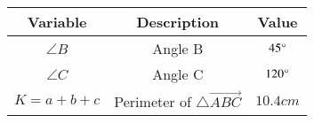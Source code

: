 \begin{tabular}[12pt]{ |c|c|c|}
    \hline
	\textbf{Variable} & \textbf{Description} & \textbf{Value} \\ 
    \hline
	$\angle B$ & Angle B & $45\degree$ \\
    \hline 
	$\angle C$ & Angle C & $120\degree$ \\
    \hline
    $K=a+b+c$ & Perimeter of $\triangle\vec{ABC}$ & $10.4cm$ \\
    \hline
\end{tabular}
